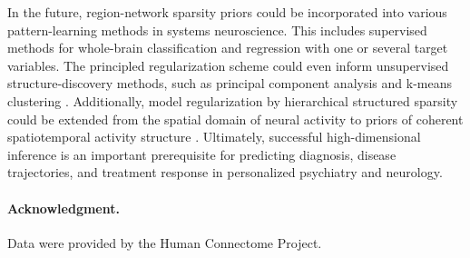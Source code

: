 \documentclass{article}
\begin{document}
In the future,
region-network sparsity priors could be incorporated into various
pattern-learning methods in systems neuroscience.
%
This includes supervised methods for whole-brain classification and regression
with one or several target variables.
The principled regularization scheme could even inform
unsupervised structure-discovery methods,
such as principal component analysis
\cite{jenatton2009structured}
and
k-means clustering \cite{witten2010framework}.
%
Additionally,
model regularization by hierarchical structured sparsity could be extended
from the spatial domain of neural activity to
priors of coherent spatiotemporal activity structure
\cite{gramfort2011tracking}.
%
Ultimately,
successful high-dimensional inference is
an important prerequisite
for predicting diagnosis,
disease trajectories, and treatment response
in personalized psychiatry and neurology.



\paragraph{Acknowledgment.}
{\small Data were provided by the Human Connectome Project.
}


  
\small
% 


% 
\end{document}

